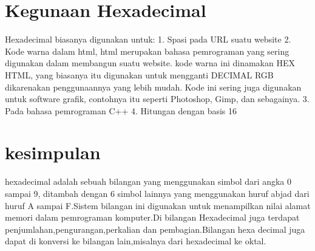  \section {Kegunaan Hexadecimal}
 Hexadecimal biasanya digunakan untuk:
 1. Spasi pada URL suatu website
 2. Kode warna dalam html, html merupakan bahasa pemrograman yang sering digunakan dalam membangun suatu website. kode warna ini dinamakan HEX HTML, yang biasanya itu digunakan untuk mengganti DECIMAL RGB dikarenakan penggunaannya yang lebih mudah. Kode ini sering juga digunakan untuk software grafik, contohnya itu seperti Photoshop, Gimp, dan sebagainya.
 3. Pada bahasa pemrograman C++
 4. Hitungan dengan basis 16
 \section{kesimpulan}
 hexadecimal adalah sebuah bilangan yang menggunakan simbol dari angka 0 sampai 9, ditambah dengan 6 simbol lainnya yang menggunakan huruf abjad dari huruf A sampai F.Sistem bilangan ini digunakan untuk menampilkan nilai alamat memori dalam pemrograman komputer.Di bilangan Hexadecimal juga terdapat penjumlahan,pengurangan,perkalian dan pembagian.Bilangan hexa decimal juga dapat di konversi ke bilangan lain,misalnya dari hexadecimal ke oktal.